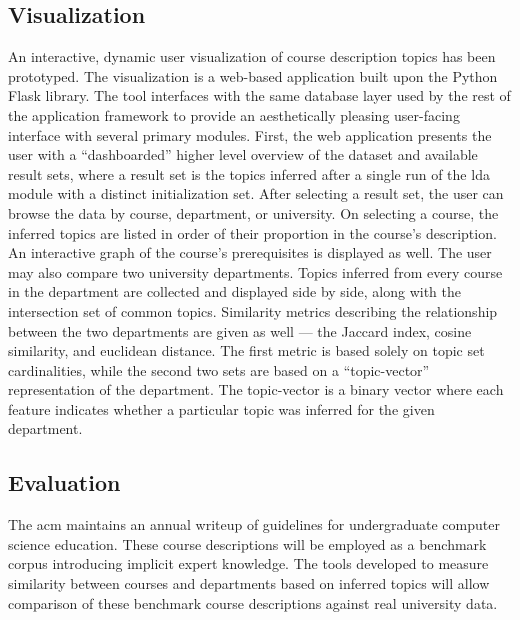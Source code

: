 \subsection{Visualization}
\label{sec:visualization}


An interactive, dynamic user visualization of course description topics has been prototyped.
The visualization is a web-based application built upon the Python Flask library.
The tool interfaces with the same database layer used by the rest of the application framework to provide an aesthetically pleasing user-facing interface with several primary modules.
First, the web application presents the user with a ``dashboarded'' higher level overview of the dataset and available result sets, where a result set is the topics inferred after a single run of the \ac{lda} module with a distinct initialization set.
After selecting a result set, the user can browse the data by course, department, or university.
On selecting a course, the inferred topics are listed in order of their proportion in the course's description.
An interactive graph of the course's prerequisites is displayed as well.
The user may also compare two university departments.
Topics inferred from every course in the department are collected and displayed side by side, along with the intersection set of common topics.
Similarity metrics describing the relationship between the two departments are given as well --- the Jaccard index, cosine similarity, and euclidean distance.
The first metric is based solely on topic set cardinalities, while the second two sets are based on a ``topic-vector'' representation of the department.
The topic-vector is a binary vector where each feature indicates whether a particular topic was inferred for the given department.


\subsection{Evaluation}
\label{sec:evaluation}


The \ac{acm} maintains an annual writeup of guidelines for undergraduate computer science education. \cite{CS2013}
These course descriptions will be employed as a benchmark corpus introducing implicit expert knowledge.
The tools developed to measure similarity between courses and departments based on inferred topics will allow comparison of these benchmark course descriptions against real university data.


